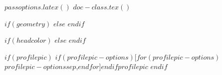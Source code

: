%
%
%
%
%
%
$passoptions.latex()$
%
$doc-class.tex()$

$if(geometry)$
\geometry{$for(geometry)$$geometry$$sep$,$endfor$}
$else$
\geometry{left=1.4cm, top=.8cm, right=1.4cm, bottom=1.8cm, footskip=.5cm}
$endif$

$if(headcolor)$
$else$
$endif$



$if(profilepic)$
\photo$if(profilepic-options)$[$for(profilepic-options)$$profilepic-options$$sep$,$endfor$]$endif${$profilepic$}
$endif$

